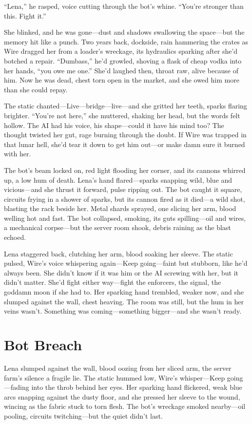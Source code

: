 \documentclass[12pt]{book}
\begin{document}
``Lena,'' he rasped, voice cutting through the bot’s whine. ``You’re stronger than this. Fight it.''

She blinked, and he was gone---dust and shadows swallowing the space---but the memory hit like a punch. Two years back, dockside, rain hammering the crates as Wire dragged her from a loader’s wreckage, its hydraulics sparking after she’d botched a repair. ``Dumbass,'' he’d growled, shoving a flask of cheap vodka into her hands, ``you owe me one.'' She’d laughed then, throat raw, alive because of him. Now he was dead, chest torn open in the market, and she owed him more than she could repay.

The static chanted---Live---bridge---live---and she gritted her teeth, sparks flaring brighter. ``You’re not here,'' she muttered, shaking her head, but the words felt hollow. The AI had his voice, his shape---could it have his mind too? The thought twisted her gut, rage burning through the doubt. If Wire was trapped in that lunar hell, she’d tear it down to get him out---or make damn sure it burned with her.

The bot’s beam locked on, red light flooding her corner, and its cannons whirred up, a low hum of death. Lena’s hand flared---sparks snapping wild, blue and vicious---and she thrust it forward, pulse ripping out. The bot caught it square, circuits frying in a shower of sparks, but its cannon fired as it died---a wild shot, blasting the rack beside her. Metal shards sprayed, one slicing her arm, blood welling hot and fast. The bot collapsed, smoking, its guts spilling---oil and wires, a mechanical corpse---but the server room shook, debris raining as the blast echoed.

Lena staggered back, clutching her arm, blood soaking her sleeve. The static pulsed, Wire’s voice whispering again---Keep going---faint but stubborn, like he’d always been. She didn’t know if it was him or the AI screwing with her, but it didn’t matter. She’d fight either way---fight the enforcers, the signal, the goddamn moon if she had to. Her sparking hand trembled, weaker now, and she slumped against the wall, chest heaving. The room was still, but the hum in her veins wasn’t. Something was coming---something bigger---and she wasn’t ready.

\section{Bot Breach}

Lena slumped against the wall, blood oozing from her sliced arm, the server farm’s silence a fragile lie. The static hummed low, Wire’s whisper---Keep going---fading into the throb behind her eyes. Her sparking hand flickered, weak blue arcs snapping against the dusty floor, and she pressed her sleeve to the wound, wincing as the fabric stuck to torn flesh. The bot’s wreckage smoked nearby---oil pooling, circuits twitching---but the quiet didn’t last.
\end{document}
